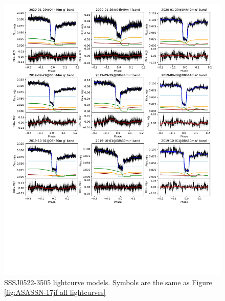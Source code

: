 \begin{figure}
    \centering
    \includegraphics[width=\columnwidth, trim={0cm 10cm 0cm 0cm}, clip]{figures/results/three_cvs_with_weird_colours/SSS111126/SSS111126_lightcurves_3.pdf}
    \caption{SSSJ0522-3505 lightcurve models. Symbols are the same as Figure \ref{fig:ASASSN-17jf all lightcurves}}
    \label{fig:SSSJ0522-3505 all lightcurves}
\end{figure}



